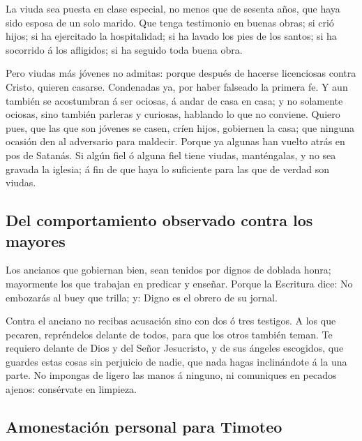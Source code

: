  La viuda sea puesta en clase especial, no menos que de
sesenta años, que haya sido esposa de un solo marido.  Que
tenga testimonio en buenas obras; si crió hijos; si ha ejercitado la
hospitalidad; si ha lavado los pies de los santos; si ha socorrido á los
afligidos; si ha seguido toda buena obra.

 Pero viudas más jóvenes no admitas: porque después de
hacerse licenciosas contra Cristo, quieren casarse. 
Condenadas ya, por haber falseado la primera fe.  Y aun
también se acostumbran á ser ociosas, á andar de casa en casa; y no
solamente ociosas, sino también parleras y curiosas, hablando lo que no
conviene.  Quiero pues, que las que son jóvenes se casen,
críen hijos, gobiernen la casa; que ninguna ocasión den al adversario
para maldecir.  Porque ya algunas han vuelto atrás en pos
de Satanás.  Si algún fiel ó alguna fiel tiene viudas,
manténgalas, y no sea gravada la iglesia; á fin de que haya lo
suficiente para las que de verdad son viudas.

\hypertarget{del-comportamiento-observado-contra-los-mayores}{%
\subsection{Del comportamiento observado contra los
mayores}\label{del-comportamiento-observado-contra-los-mayores}}

 Los ancianos que gobiernan bien, sean tenidos por dignos
de doblada honra; mayormente los que trabajan en predicar y enseñar.
 Porque la Escritura dice: No embozarás al buey que trilla;
y: Digno es el obrero de su jornal.

 Contra el anciano no recibas acusación sino con dos ó tres
testigos.  A los que pecaren, repréndelos delante de todos,
para que los otros también teman.  Te requiero delante de
Dios y del Señor Jesucristo, y de sus ángeles escogidos, que guardes
estas cosas sin perjuicio de nadie, que nada hagas inclinándote á la una
parte.  No impongas de ligero las manos á ninguno, ni
comuniques en pecados ajenos: consérvate en limpieza.

\hypertarget{amonestaciuxf3n-personal-para-timoteo}{%
\subsection{Amonestación personal para
Timoteo}\label{amonestaciuxf3n-personal-para-timoteo}}

